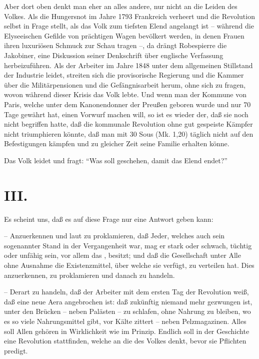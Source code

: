 \documentclass{scrbook}
\begin{document}
Aber dort oben denkt man eher an alles andere, nur nicht an die Leiden des Volkes. Als die Hungersnot im Jahre 1793 Frankreich verheert und die Revolution selbst in Frage stellt, als das Volk zum tiefsten Elend angelangt ist – während die Elyseeischen Gefilde von prächtigen Wagen bevölkert werden, in denen Frauen ihren luxuriösen Schmuck zur Schau tragen –, da drängt Robespierre die Jakobiner, eine Diskussion seiner Denkschrift über englische Verfassung herbeizuführen. Als der Arbeiter im Jahre 1848 unter dem allgemeinen Stillstand der Industrie leidet, streiten sich die provisorische Regierung und die Kammer über die Militärpensionen und die Gefängnisarbeit herum, ohne sich zu fragen, wovon während dieser Krisis das Volk lebte. Und wenn man der Kommune von Paris, welche unter dem Kanonendonner der Preußen geboren wurde und nur 70 Tage gewährt hat, einen Vorwurf machen will, so ist es wieder der, daß sie noch nicht begriffen hatte, daß die kommunale Revolution ohne gut gespeiste Kämpfer nicht triumphieren könnte, daß man mit 30 Sous (Mk. 1,20) täglich nicht auf den Befestigungen kämpfen und zu gleicher Zeit seine Familie erhalten könne.

Das Volk leidet und fragt: ``Was soll geschehen, damit das Elend endet?''

\section*{III.}

Es scheint uns, daß es auf diese Frage nur eine Antwort geben kann:

– Anzuerkennen und laut zu proklamieren, daß Jeder, welches auch sein sogenannter Stand in der Vergangenheit war, mag er stark oder schwach, tüchtig oder unfähig sein, vor allem das , besitzt; und daß die Gesellschaft unter Alle ohne Ausnahme die Existenzmittel, über welche sie verfügt, zu verteilen hat. Dies anzuerkennen, zu proklamieren und danach zu handeln.

– Derart zu handeln, daß der Arbeiter mit dem ersten Tag der Revolution weiß, daß eine neue Aera angebrochen ist: daß zukünftig niemand mehr gezwungen ist, unter den Brücken – neben Palästen – zu schlafen, ohne Nahrung zu bleiben, wo es so viele Nahrungsmittel gibt, vor Kälte zittert – neben Pelzmagazinen. Alles soll Allen gehören in Wirklichkeit wie im Prinzip. Endlich soll in der Geschichte eine Revolution stattfinden, welche an die  des Volkes denkt, bevor sie Pflichten predigt.
\end{document}
